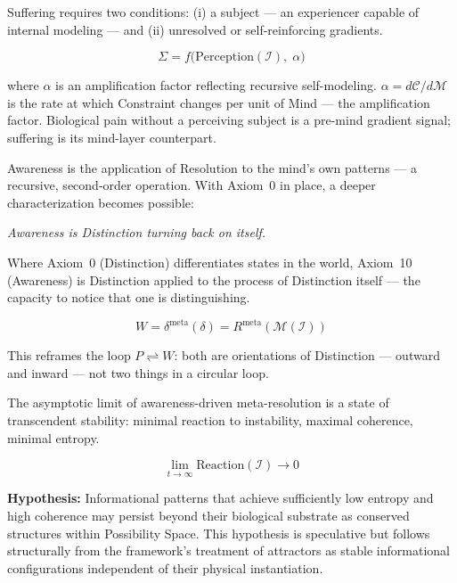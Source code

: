 \documentclass[12pt, a4paper]{article}
\begin{document}
\begin{formalbox}[title={Axiom 9: Suffering as Amplified Perceived Instability ($\Sigma$)}]
Suffering requires two conditions: (i) a subject --- an experiencer capable of internal
modeling --- and (ii) unresolved or self-reinforcing gradients.

\[
  \Sigma = f\bigl(\mathrm{Perception}(\mathcal{I}),\; \alpha \bigr)
\]

where $\alpha$ is an amplification factor reflecting recursive self-modeling.
$\alpha = d\mathcal{C}/d\mathcal{M}$ is the rate at which Constraint changes per unit
of Mind --- the amplification factor. Biological pain without a perceiving subject is a
pre-mind gradient signal; suffering is its mind-layer counterpart.
\end{formalbox}

\begin{formalbox}[title={Axiom 10: Awareness as Distinction Turned Inward ($W$)}]
Awareness is the application of Resolution to the mind's own patterns --- a recursive,
second-order operation. With Axiom~0 in place, a deeper characterization becomes
possible:

\textit{Awareness is Distinction turning back on itself.}

Where Axiom~0 (Distinction) differentiates states in the world, Axiom~10 (Awareness)
is Distinction applied to the process of Distinction itself --- the capacity to notice
that one is distinguishing.

\[
  W = \delta^{\mathrm{meta}}(\delta) = R^{\mathrm{meta}}(\mathcal{M}(\mathcal{I}))
\]

This reframes the loop $P \rightleftharpoons W$: both are orientations of Distinction
--- outward and inward --- not two things in a circular loop.
\end{formalbox}

\begin{formalbox}[title={Axiom 11: Transcendent Stability and Post-Biological Persistence}]
The asymptotic limit of awareness-driven meta-resolution is a state of transcendent
stability: minimal reaction to instability, maximal coherence, minimal entropy.

\[
  \lim_{t\to\infty} \mathrm{Reaction}(\mathcal{I}) \to 0
\]

\textbf{Hypothesis:} Informational patterns that achieve sufficiently low entropy and
high coherence may persist beyond their biological substrate as conserved structures
within Possibility Space. This hypothesis is speculative but follows structurally from
the framework's treatment of attractors as stable informational configurations
independent of their physical instantiation.
\end{formalbox}
\end{document}
